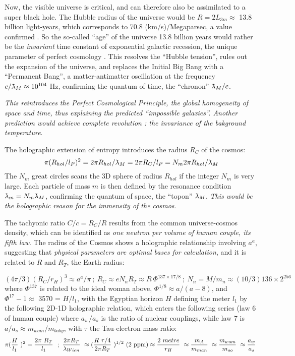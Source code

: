 \documentclass[a4paper,12pt]{article}
\newcommand{\Frac}[2]{\mbox{$\displaystyle\frac{#1}{#2}$ }}
\newcommand{\lambdabar}{{\mkern0.75mu\mathchar '26\mkern -9.75mu\lambda}}
\begin{document}
Now, the visible universe is critical, and can therefore also be assimilated to a super black hole. The Hubble radius of the universe would be $R = 2L_{3m} \approx$ 13.8 billion light-years, which corresponds to 70.8 (km/s)/Megaparsec, a value confirmed \citep{freedman}. So the so-called “age” of the universe 13.8 billion years would rather be the \textit{invariant} time constant of exponential galactic recession, the unique parameter of perfect cosmology \citep{bondi_gold_1948}. This resolves the “Hubble tension”, rules out the expansion of the universe, and replaces the Initial Big Bang with a “Permanent Bang”, a matter-antimatter oscillation at the frequency $c/\lambdabar_M \approx  10^{104}$ Hz, confirming the quantum of time, the “chronon” $\lambdabar_M/c$. 

\textit{This reintroduces the Perfect Cosmological Principle, the global homogeneity of space \textit{and} time, thus explaining the predicted “impossible galaxies”. Another prediction would achieve complete revolution : the invariance of the bakground temperature}. 

The holographic extension of entropy introduces the radius $R_{C}$ of the cosmos:
\begin{equation}
    \pi (R_{hol}/l_P )^2 = 2\pi R_{hol}/ \lambdabar_M= 2\pi R_{C}/l_P = N_m 2\pi R_{hol}/ \lambdabar_M 
\end{equation}
 The $N_m$ great circles scans the 3D sphere of radius $R_{hol}$ if the integer $N_m$ is very large. Each particle of mass $m$ is then defined by the resonance condition $\lambdabar_m = N_m\lambdabar_M$, confirming the quantum of space, the “topon” $\lambdabar_M$.\textit{ This would be the holographic reason for the immensity of the cosmos}.
 
 The tachyonic ratio $C/c = R_C/R$ results from the common universe-cosmos density, which can be identified as \textit{one neutron per volume of human couple, its fifth law}. The radius of the Cosmos shows a holographic relationship involving $a^a$, suggesting that \textit{physical parameters are optimal bases for calculation}, and it is related to $R$ and $R_T$, the Earth radius:
 
\begin{equation}
 (4\pi/3)(R_C/r_H)^3\approx a^a/\pi ~;~ R_C \approx e N_n R_T \approx R ~\Phi^{137\times 17/8} ~;~N_n = M/m_n \approx (10/3) 136\times 2^{256} 
\end{equation}
where $\Phi^{137}$ is related to the ideal woman above, $\Phi^{1/8}\approx a/(a-8)$, and $\Phi^{17}-1\approx$ 3570 = $H/l_1$, with the Egyptian horizon $H$ defining the meter $l_1$ by the following 2D-1D holographic relation, which enters the following series (law 6 of human couple) where $a_w/a_s$ is the ratio of nuclear couplings, while law 7 is $a/a_s \approx m_{wom}/m_{baby}$, with $\tau$ the Tau-electron mass ratio:
\begin{equation}
 \pi(\Frac{H}{l_1})^2 = \Frac{2\pi~R_T}{l_1}~;~ \Frac{2\pi R_T}{\lambda_{Wien}} \approx (\Frac{R ~\tau/4}{2\pi R_T})^{1/2} ~(2~\rm{ppm})  \approx\Frac{2 ~metre}{r_H} \approx \Frac{m_A}{m_{man}} \approx \Frac{m_{wom}}{m_{oo}} \approx \Frac{a_w}{a_s} 
\end{equation} 
\end{document}

